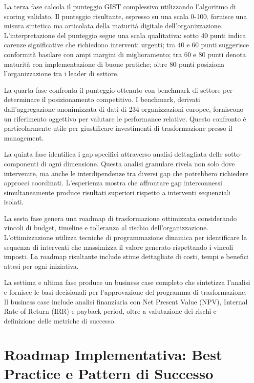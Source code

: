 La terza fase calcola il punteggio GIST complessivo utilizzando l'algoritmo di scoring validato. Il punteggio risultante, espresso su una scala 0-100, fornisce una misura sintetica ma articolata della maturità digitale dell'organizzazione. L'interpretazione del punteggio segue una scala qualitativa: sotto 40 punti indica carenze significative che richiedono interventi urgenti; tra 40 e 60 punti suggerisce conformità basilare con ampi margini di miglioramento; tra 60 e 80 punti denota maturità con implementazione di buone pratiche; oltre 80 punti posiziona l'organizzazione tra i leader di settore.

La quarta fase confronta il punteggio ottenuto con benchmark di settore per determinare il posizionamento competitivo. I benchmark, derivati dall'aggregazione anonimizzata di dati di 234 organizzazioni europee, forniscono un riferimento oggettivo per valutare le performance relative. Questo confronto è particolarmente utile per giustificare investimenti di trasformazione presso il management.

La quinta fase identifica i gap specifici attraverso analisi dettagliata delle sotto-componenti di ogni dimensione. Questa analisi granulare rivela non solo dove intervenire, ma anche le interdipendenze tra diversi gap che potrebbero richiedere approcci coordinati. L'esperienza mostra che affrontare gap interconnessi simultaneamente produce risultati superiori rispetto a interventi sequenziali isolati.

La sesta fase genera una roadmap di trasformazione ottimizzata considerando vincoli di budget, timeline e tolleranza al rischio dell'organizzazione. L'ottimizzazione utilizza tecniche di programmazione dinamica per identificare la sequenza di interventi che massimizza il valore generato rispettando i vincoli imposti. La roadmap risultante include stime dettagliate di costi, tempi e benefici attesi per ogni iniziativa.

La settima e ultima fase produce un business case completo che sintetizza l'analisi e fornisce le basi decisionali per l'approvazione del programma di trasformazione. Il business case include analisi finanziaria con Net Present Value (NPV), Internal Rate of Return (IRR) e payback period, oltre a valutazione dei rischi e definizione delle metriche di successo.

\section{Roadmap Implementativa: Best Practice e Pattern di Successo}

